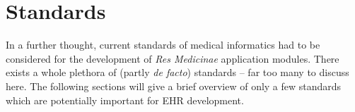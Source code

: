 %
%
%
%
%
%
%

\section{Standards}
\label{standards_heading}

In a further thought, current standards of medical informatics had to be
considered for the development of \emph{Res Medicinae} application modules.
There exists a whole plethora of (partly \emph{de facto}) standards -- far too
many to discuss here. The following sections will give a brief overview of only
a few standards which are potentially important for EHR development.








